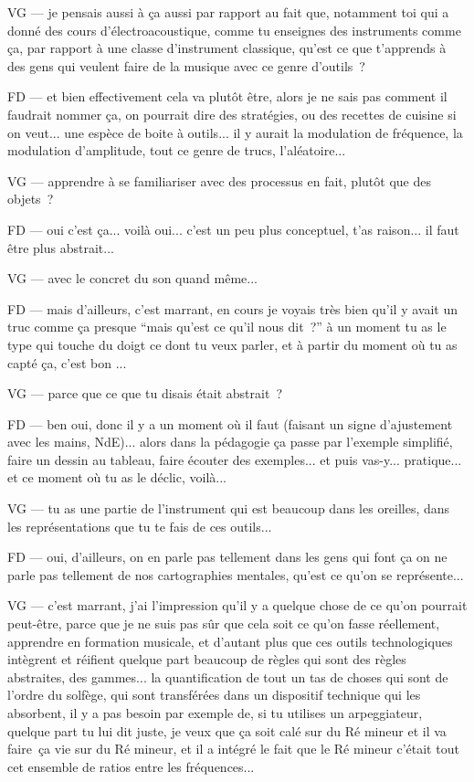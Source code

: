 VG — je pensais aussi à ça aussi par rapport au fait que, notamment toi qui a donné des cours d'électroacoustique, comme tu enseignes des instruments comme ça, par rapport à une classe d'instrument classique, qu'est ce que t'apprends à des gens qui veulent faire de la musique avec ce genre d'outils ? 

FD — et bien effectivement cela va plutôt être, alors je ne sais pas comment il faudrait nommer ça, on pourrait dire des stratégies, ou des recettes de cuisine si on veut... une espèce de boite à outils... il y aurait la modulation de fréquence, la modulation d'amplitude, tout ce genre de trucs, l'aléatoire... 

VG — apprendre à se familiariser avec des processus en fait, plutôt que des objets ? 

FD — oui c'est ça... voilà oui... c'est un peu plus conceptuel, t'as raison... il faut être plus abstrait... 

VG — avec le concret du son quand même... 

FD — mais d'ailleurs, c'est marrant, en cours je voyais très bien qu'il y avait un truc comme ça presque ``mais qu'est ce qu'il nous dit ?'' à un moment tu as le type qui touche du doigt ce dont tu veux parler, et à partir du moment où tu as capté ça, c'est bon ... 

VG — parce que ce que tu disais était abstrait ? 

FD — ben oui, donc il y a un moment où il faut (faisant un signe d'ajustement avec les mains, NdE)... alors dans la pédagogie ça passe par l'exemple simplifié, faire un dessin au tableau, faire écouter des exemples... et puis vas-y... pratique... et ce moment où tu as le déclic, voilà... 

VG — tu as une partie de l'instrument qui est beaucoup dans les oreilles, dans les représentations que tu te fais de ces outils... 

FD — oui, d'ailleurs, on en parle pas tellement dans les gens qui font ça on ne parle pas tellement de nos cartographies mentales, qu'est ce qu'on se représente... 

VG — c'est marrant, j'ai l'impression qu'il y a quelque chose de ce qu'on pourrait peut-être, parce que je ne suis pas sûr que cela soit ce qu'on fasse réellement, apprendre en formation musicale, et d'autant plus que ces outils technologiques intègrent et réifient quelque part beaucoup de règles qui sont des règles abstraites, des gammes... la quantification de tout un tas de choses qui sont de l'ordre du solfège, qui sont transférées dans un dispositif technique qui les absorbent, il y a pas besoin par exemple de, si tu utilises un arpeggiateur, quelque part tu lui dit juste, je veux que ça soit calé sur du Ré mineur et il va faire ça vie sur du Ré mineur, et il a intégré le fait que le Ré mineur c'était tout cet ensemble de ratios entre les fréquences... 

